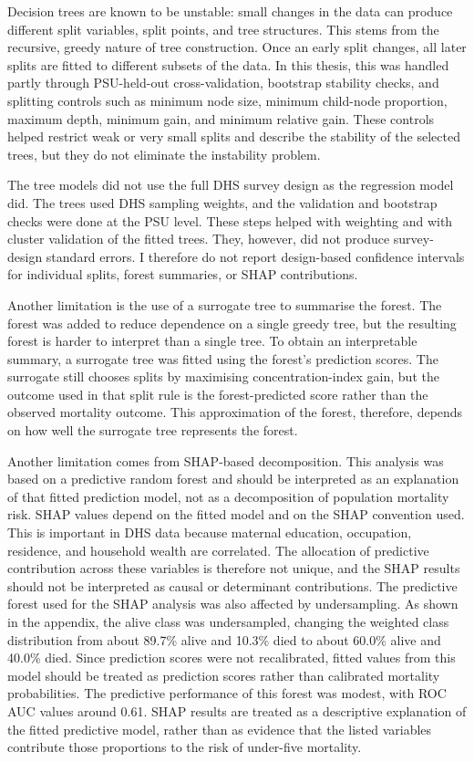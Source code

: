 \documentclass[
  11pt,
  a4paper,
]{article}
\begin{document}
Decision trees are known to be unstable: small changes in the data can
produce different split variables, split points, and tree structures.
This stems from the recursive, greedy nature of tree construction. Once
an early split changes, all later splits are fitted to different subsets
of the data. In this thesis, this was handled partly through
PSU-held-out cross-validation, bootstrap stability checks, and splitting
controls such as minimum node size, minimum child-node proportion,
maximum depth, minimum gain, and minimum relative gain. These controls
helped restrict weak or very small splits and describe the stability of
the selected trees, but they do not eliminate the instability problem.

The tree models did not use the full DHS survey design as the regression
model did. The trees used DHS sampling weights, and the validation and
bootstrap checks were done at the PSU level. These steps helped with
weighting and with cluster validation of the fitted trees. They,
however, did not produce survey-design standard errors. I therefore do
not report design-based confidence intervals for individual splits,
forest summaries, or SHAP contributions.

Another limitation is the use of a surrogate tree to summarise the
forest. The forest was added to reduce dependence on a single greedy
tree, but the resulting forest is harder to interpret than a single
tree. To obtain an interpretable summary, a surrogate tree was fitted
using the forest's prediction scores. The surrogate still chooses splits
by maximising concentration-index gain, but the outcome used in that
split rule is the forest-predicted score rather than the observed
mortality outcome. This approximation of the forest, therefore, depends
on how well the surrogate tree represents the forest.

Another limitation comes from SHAP-based decomposition. This analysis
was based on a predictive random forest and should be interpreted as an
explanation of that fitted prediction model, not as a decomposition of
population mortality risk. SHAP values depend on the fitted model and on
the SHAP convention used. This is important in DHS data because maternal
education, occupation, residence, and household wealth are correlated.
The allocation of predictive contribution across these variables is
therefore not unique, and the SHAP results should not be interpreted as
causal or determinant contributions. The predictive forest used for the
SHAP analysis was also affected by undersampling. As shown in the
appendix, the alive class was undersampled, changing the weighted class
distribution from about 89.7\% alive and 10.3\% died to about 60.0\%
alive and 40.0\% died. Since prediction scores were not recalibrated,
fitted values from this model should be treated as prediction scores
rather than calibrated mortality probabilities. The predictive
performance of this forest was modest, with ROC AUC values around 0.61.
SHAP results are treated as a descriptive explanation of the fitted
predictive model, rather than as evidence that the listed variables
contribute those proportions to the risk of under-five mortality.
\end{document}
